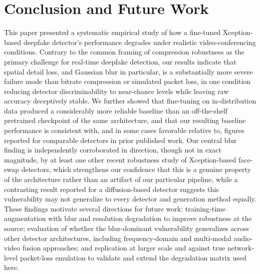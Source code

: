 \documentclass[conference]{IEEEtran}
\begin{document}
\section{Conclusion and Future Work}
This paper presented a systematic empirical study of how a fine-tuned Xception-based deepfake detector's performance degrades under realistic video-conferencing conditions. Contrary to the common framing of compression robustness as the primary challenge for real-time deepfake detection, our results indicate that spatial detail loss, and Gaussian blur in particular, is a substantially more severe failure mode than bitrate compression or simulated packet loss, in one condition reducing detector discriminability to near-chance levels while leaving raw accuracy deceptively stable. We further showed that fine-tuning on in-distribution data produced a considerably more reliable baseline than an off-the-shelf pretrained checkpoint of the same architecture, and that our resulting baseline performance is consistent with, and in some cases favorable relative to, figures reported for comparable detectors in prior published work. Our central blur finding is independently corroborated in direction, though not in exact magnitude, by at least one other recent robustness study of Xception-based face-swap detectors, which strengthens our confidence that this is a genuine property of the architecture rather than an artifact of our particular pipeline, while a contrasting result reported for a diffusion-based detector suggests this vulnerability may not generalize to every detector and generation method equally. These findings motivate several directions for future work: training-time augmentation with blur and resolution degradation to improve robustness at the source; evaluation of whether the blur-dominant vulnerability generalizes across other detector architectures, including frequency-domain and multi-modal audio-video fusion approaches; and replication at larger scale and against true network-level packet-loss emulation to validate and extend the degradation matrix used here.
\end{document}
